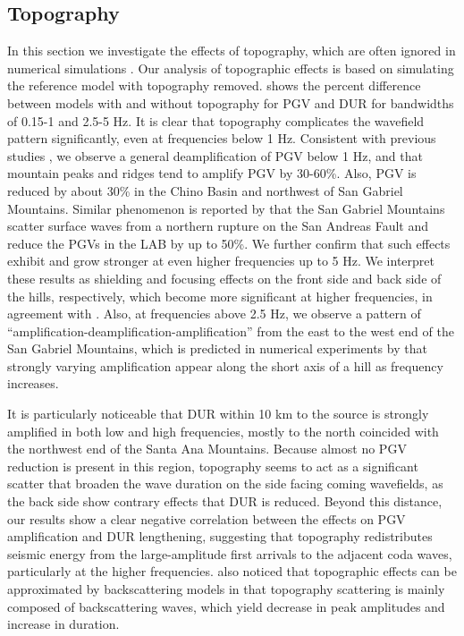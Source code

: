 \subsection{Topography}
In this section we investigate the effects of topography, which are often ignored in numerical simulations . Our analysis of topographic effects is based on simulating the reference model with topography removed.
 shows the percent difference between models with and without topography for PGV and DUR for bandwidths of 0.15-1 and 2.5-5 Hz. It is clear that topography complicates the wavefield pattern significantly, even at frequencies below 1 Hz. Consistent with previous studies , we observe a general deamplification of PGV below 1 Hz, and that mountain peaks and ridges tend to amplify PGV by 30-60\%. Also, PGV is reduced by about 30\% in the Chino Basin and northwest of San Gabriel Mountains. Similar phenomenon is reported by \citet{maEffectsLargeScaleSurface2007} that the San Gabriel Mountains scatter surface waves from a northern rupture on the San Andreas Fault and reduce the PGVs in the LAB by up to 50\%. We further confirm that such effects exhibit and grow stronger at even higher frequencies up to 5 Hz. We interpret these results as shielding and focusing effects on the front side and back side of the hills, respectively, which become more significant at higher frequencies, in agreement with \citet{liuScatteringSeismicWaves2020}. Also, at frequencies above 2.5 Hz, we observe a pattern of “amplification-deamplification-amplification” from the east to the west end of the San Gabriel Mountains, which is predicted in numerical experiments by \citet{liuScatteringSeismicWaves2020} that strongly varying amplification appear along the short axis of a hill as frequency increases.

It is particularly noticeable that DUR within 10 km to the source is strongly amplified in both low and high frequencies, mostly to the north coincided with the northwest end of the Santa Ana Mountains. Because almost no PGV reduction is present in this region, topography seems to act as a significant scatter that broaden the wave duration on the side facing coming wavefields, as the back side show contrary effects that DUR is reduced. Beyond this distance, our results show a clear negative correlation between the effects on PGV amplification and DUR lengthening, suggesting that topography redistributes seismic energy from the large-amplitude first arrivals to the adjacent coda waves, particularly at the higher frequencies. \citet{imperatoriRoleTopographyLateral2015} also noticed that topographic effects can be approximated by backscattering models in that topography scattering is mainly composed of backscattering waves, which yield decrease in peak amplitudes and increase in duration.

